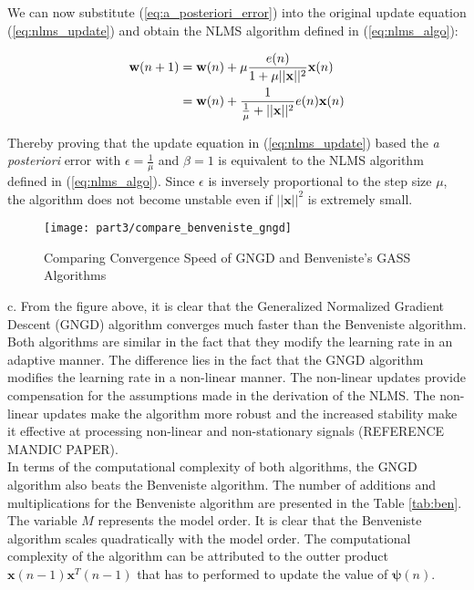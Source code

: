 \noindent{}We can now substitute (\ref{eq:a_posteriori_error}) into the original update equation (\ref{eq:nlms_update}) and obtain the NLMS algorithm defined in (\ref{eq:nlms_algo}):

\begin{align}
\textbf{w}(n+1) &= \textbf{w}(n) + \mu \frac{e(n)}{1+\mu ||\textbf{\textbf{x}}||^2}\textbf{x}(n) \nonumber\\
&= \textbf{w}(n) + \frac{1}{\frac{1}{\mu}+ ||\textbf{\textbf{x}}||^2}e(n)\textbf{x}(n) 
\end{align}

\noindent{}Thereby proving that the update equation in (\ref{eq:nlms_update}) based the \textit{a posteriori} error with $\epsilon=\frac{1}{\mu}$ and $\beta=1$ is equivalent to the NLMS algorithm defined in (\ref{eq:nlms_algo}). Since $\epsilon$ is inversely proportional to the step size $\mu$, the algorithm does not become unstable even if $||\textbf{x}||^2$ is extremely small.

\begin{figure}[H]
\centering{}
\texttt{[image: part3/compare\_benveniste\_gngd]}
\caption{Comparing Convergence Speed of GNGD and Benveniste's GASS Algorithms}
\end{figure}

\noindent{}c. From the figure above, it is clear that the Generalized Normalized Gradient Descent (GNGD) algorithm converges much faster than the Benveniste algorithm. Both algorithms are similar in the fact that they modify the learning rate in an adaptive manner. The difference lies in the fact that the GNGD algorithm modifies the learning rate in a non-linear manner. The non-linear updates provide compensation for the assumptions made in the derivation of the NLMS. The non-linear updates make the algorithm more robust and the increased stability make it effective at processing non-linear and non-stationary signals (REFERENCE MANDIC PAPER).\\

\noindent{}In terms of the computational complexity of both algorithms, the GNGD algorithm also beats the Benveniste algorithm. The number of additions and multiplications for the Benveniste algorithm are presented in the Table \ref{tab:ben}. The variable $M$ represents the model order. It is clear that the Benveniste algorithm scales quadratically with the model order. The computational complexity of the algorithm can be attributed to the outter product $\textbf{x}(n-1)\textbf{x}^T(n-1)$ that has to performed to update the value of $\bm{\psi}(n)$. 

